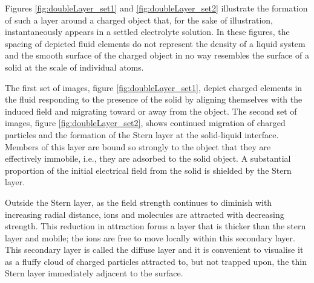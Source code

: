 {    Figures \ref{fig:doubleLayer_set1} and \ref{fig:doubleLayer_set2} illustrate the formation of such a layer around a charged object that, for the sake of illustration, instantaneously appears in a settled electrolyte solution. In these figures, the spacing of depicted fluid elements do not represent the density of a liquid system and the smooth surface of the charged object in no way resembles the surface of a solid at the scale of individual atoms.

    The first set of images, figure \ref{fig:doubleLayer_set1}, depict charged elements in the fluid responding to the presence of the solid by aligning themselves with the induced field and migrating toward or away from the object. The second set of images, figure \ref{fig:doubleLayer_set2}, shows continued migration of charged particles and the formation of the Stern layer at the solid-liquid interface. Members of this layer are bound so strongly to the object that they are effectively immobile, i.e., they are adsorbed to the solid object. A substantial proportion of the initial electrical field from the solid is shielded by the Stern layer.

    Outside the Stern layer, as the field strength continues to diminish with increasing radial distance, ions and molecules are attracted with decreasing strength. This reduction in attraction forms a layer that is thicker than the stern layer and mobile; the ions are free to move locally within this secondary layer. This secondary layer is called the diffuse layer and it is convenient to visualise it as a fluffy cloud of charged particles attracted to, but not trapped upon, the thin Stern layer immediately adjacent to the surface.

}
